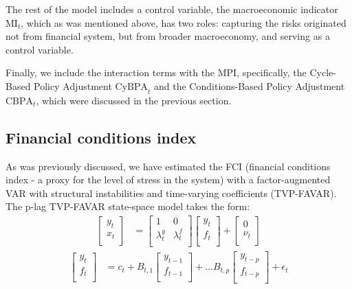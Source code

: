 \documentclass[12pt,a4paper]{article}
\begin{document}
The rest of the model includes a control variable, the macroeconomic indicator $\text{MI}_t$, which as was mentioned above, has two roles: capturing the risks originated not from financial system, but from broader macroeconomy, and serving as a control variable.

Finally, we include the interaction terms with the MPI, specifically, the Cycle-Based Policy Adjustment $\text{CyBPA}_t$ and the Conditions-Based Policy Adjustment $\text{CBPA}_t$, which were discussed in the previous section.

\subsection{Financial conditions index}
As was previously discussed, we have estimated the FCI (financial conditions index - a proxy for the level of stress in the system) with a factor-augmented VAR with structural instabilities and time-varying coefficients (TVP-FAVAR). The p-lag TVP-FAVAR \citep{koop_2013} state-space model takes the form:
\begin{align}
    \label{eq:tvpfavar_design}
    \begin{bmatrix}
        y_t \\
        x_t \\
    \end{bmatrix} &= 
    \begin{bmatrix}
        1 & 0 \\
        \lambda_t^y & \lambda_t^f \\
    \end{bmatrix}
    \begin{bmatrix}
        y_t \\
        f_t \\
    \end{bmatrix} +
    \begin{bmatrix}
        0 \\
        \nu_t \\
    \end{bmatrix}
\end{align}
\begin{align}
    \label{eq:tvpfavar_transition}
    \begin{bmatrix}
        y_t \\
        f_t \\
    \end{bmatrix} &=
    c_t +
    B_{t,1}
    \begin{bmatrix}
        y_{t-1} \\
        f_{t-1} \\
    \end{bmatrix} + \dots
    B_{t,p}
    \begin{bmatrix}
        y_{t-p} \\
        f_{t-p} \\
    \end{bmatrix} + \epsilon_t
\end{align}
\end{document}
